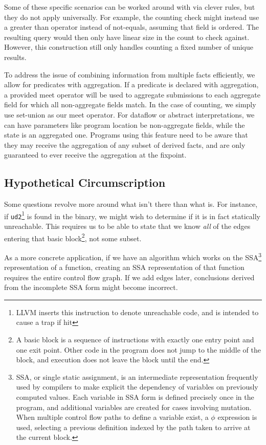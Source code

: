 Some of these specific scenarios can be worked around with via clever rules, but they do not apply universally.
For example, the counting check might instead use a greater than operator instead of not-equals, assuming that field is ordered.
The resulting query would then only have linear size in the count to check against.
However, this construction still only handles counting a fixed number of unique results.

To address the issue of combining information from multiple facts efficiently, we allow for predicates with aggregation.
If a predicate is declared with aggregation, a provided meet operator will be used to aggregate submissions to each aggregate field for which all non-aggregate fields match.
In the case of counting, we simply use set-union as our meet operator.
For dataflow or abstract interpretations, we can have parameters like program location be non-aggregate fields, while the state is an aggregated one.
Programs using this feature need to be aware that they may receive the aggregation of any subset of derived facts, and are only guaranteed to ever receive the aggregation at the fixpoint.

\subsection{Hypothetical Circumscription}
Some questions revolve more around what isn't there than what is.
For instance, if \texttt{ud2}\footnote{
LLVM inserts this instruction to denote unreachable code, and is intended to cause a trap if hit
} is found in the binary, we might wish to determine if it is in fact statically unreachable.
This requires us to be able to state that we know \emph{all} of the edges entering that basic block\footnote{
A basic block is a sequence of instructions with exactly one entry point and one exit point.
Other code in the program does not jump to the middle of the block, and execution does not leave the block until the end.
}, not some subset.

As a more concrete application, if we have an algorithm which works on the SSA\footnote{
SSA, or single static assignment, is an intermediate representation frequently used by compilers to make explicit the dependency of variables on previously computed values.
Each variable in SSA form is defined precisely once in the program, and additional variables are created for cases involving mutation.
When multiple control flow paths to define a variable exist, a $\phi$ expression is used, selecting a previous definition indexed by the path taken to arrive at the current block.
} representation of a function, creating an SSA representation of that function requires the entire control flow graph.
If we add edges later, conclusions derived from the incomplete SSA form might become incorrect.


